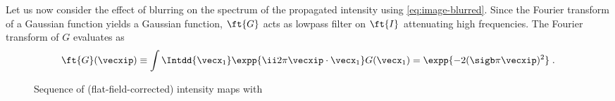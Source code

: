 \documentclass[
twoside,
openright,
titlepage,
numbers=noenddot,
headinclude,
fleqn,
a4paper,
footinclude=true,
cleardoublepage=empty,
abstractoff,
BCOR=5mm,
paper=a4,
fontsize=11pt,
british,ngerman,american,
]{scrreprt}
\begin{document}
Let us now consider the effect of blurring on the spectrum of the
propagated intensity using \cref{eq:image-blurred}.  Since the Fourier
transform of a Gaussian function yields a Gaussian function, $\ft{G}$
acts as low\hyph pass filter on $\ft{I}$ attenuating high frequencies.
The Fourier transform of $G$ evaluates as
\begin{equation}
  \label{eq:blur-filter-ft}
  \ft{G}(\vecxip) \equiv 
  \int\Intdd{\vecx_1}\expp{\ii 2\pi\vecxip\cdot\vecx_1}G(\vecx_1)
  = \expp{-2 (\sigb\pi\vecxip)^2} \;.
\end{equation}

\begin{figure}
  \centering
  \caption[Intensity contrast in dependence of propagation
  distance.]{Sequence of (flat-field-corrected) intensity maps with
}
\end{figure}
\end{document}
